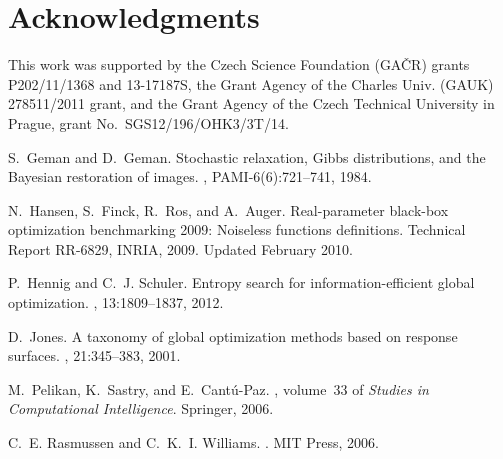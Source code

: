 \documentclass{sig-alternate}
\begin{document}


\section{Acknowledgments}

This work was supported by 
the Czech Science Foundation (GA\v{C}R) grants \hbox{P202/11/1368} and \hbox{13-17187S},
the Grant Agency of the Charles Univ. (GAUK) \hbox{278511/2011} grant, 
and
the Grant Agency of the Czech Technical University in Prague, grant No.~\hbox{SGS12/196/OHK3/3T/14}.

%

\begin{thebibliography}{1}

S.~Geman and D.~Geman.
\newblock Stochastic relaxation, {G}ibbs distributions, and the {B}ayesian
  restoration of images.
,
  PAMI-6(6):721--741, 1984.

N.~Hansen, S.~Finck, R.~Ros, and A.~Auger.
\newblock Real-parameter black-box optimization benchmarking 2009: Noiseless
  functions definitions.
\newblock Technical Report RR-6829, INRIA, 2009.
\newblock Updated February 2010.

P.~Hennig and C.~J. Schuler.
\newblock Entropy search for information-efficient global optimization.
, 13:1809--1837, 2012.

D.~Jones.
\newblock A taxonomy of global optimization methods based on response surfaces.
, 21:345--383, 2001.

M.~Pelikan, K.~Sastry, and E.~Cant\'{u}-Paz.
, volume~33 of
  {\em Studies in Computational Intelligence}.
\newblock Springer, 2006.

C.~E. Rasmussen and C.~K.~I. Williams.
.
\newblock MIT Press, 2006.

\end{thebibliography}
%
%
\end{document}
